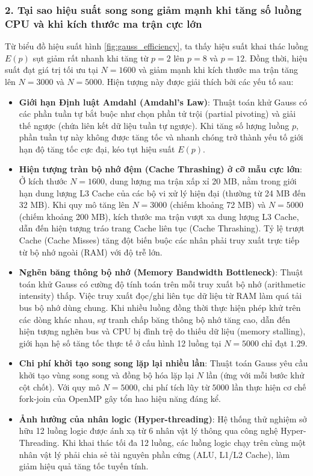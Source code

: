 \subsubsection{2. Tại sao hiệu suất song song giảm mạnh khi tăng số luồng CPU và khi kích thước ma trận cực lớn}
Từ biểu đồ hiệu suất hình \ref{fig:gauss_efficiency}, ta thấy hiệu suất khai thác luồng $E(p)$ sụt giảm rất nhanh khi tăng từ $p=2$ lên $p=8$ và $p=12$. Đồng thời, hiệu suất đạt giá trị tối ưu tại $N=1600$ và giảm mạnh khi kích thước ma trận tăng lên $N=3000$ và $N=5000$. Hiện tượng này được giải thích bởi các yếu tố sau:
\begin{itemize}
  \item \textbf{Giới hạn Định luật Amdahl (Amdahl's Law)}: Thuật toán khử Gauss có các phần tuần tự bắt buộc như chọn phần tử trội (partial pivoting) và giải thế ngược (chứa liên kết dữ liệu tuần tự ngược). Khi tăng số lượng luồng $p$, phần tuần tự này không được tăng tốc và nhanh chóng trở thành yếu tố giới hạn độ tăng tốc cực đại, kéo tụt hiệu suất $E(p)$.
  \item \textbf{Hiện tượng tràn bộ nhớ đệm (Cache Thrashing) ở cỡ mẫu cực lớn}: Ở kích thước $N=1600$, dung lượng ma trận xấp xỉ 20 MB, nằm trong giới hạn dung lượng L3 Cache của các bộ vi xử lý hiện đại (thường từ 24 MB đến 32 MB). Khi quy mô tăng lên $N=3000$ (chiếm khoảng 72 MB) và $N=5000$ (chiếm khoảng 200 MB), kích thước ma trận vượt xa dung lượng L3 Cache, dẫn đến hiện tượng tráo trang Cache liên tục (Cache Thrashing). Tỷ lệ trượt Cache (Cache Misses) tăng đột biến buộc các nhân phải truy xuất trực tiếp từ bộ nhớ ngoài (RAM) với độ trễ lớn.
  \item \textbf{Nghẽn băng thông bộ nhớ (Memory Bandwidth Bottleneck)}: Thuật toán khử Gauss có cường độ tính toán trên mỗi truy xuất bộ nhớ (arithmetic intensity) thấp. Việc truy xuất đọc/ghi liên tục dữ liệu từ RAM làm quá tải bus bộ nhớ dùng chung. Khi nhiều luồng đồng thời thực hiện phép khử trên các dòng khác nhau, sự tranh chấp băng thông bộ nhớ tăng cao, dẫn đến hiện tượng nghẽn bus và CPU bị đình trệ do thiếu dữ liệu (memory stalling), giới hạn hệ số tăng tốc thực tế ở cấu hình 12 luồng tại $N=5000$ chỉ đạt $1.29$.
  \item \textbf{Chi phí khởi tạo song song lặp lại nhiều lần}: Thuật toán Gauss yêu cầu khởi tạo vùng song song và đồng bộ hóa lặp lại $N$ lần (ứng với mỗi bước khử cột chốt). Với quy mô $N=5000$, chi phí tích lũy từ $5000$ lần thực hiện cơ chế fork-join của OpenMP gây tổn hao hiệu năng đáng kể.
  \item \textbf{Ảnh hưởng của nhân logic (Hyper-threading)}: Hệ thống thử nghiệm sở hữu 12 luồng logic được ánh xạ từ 6 nhân vật lý thông qua công nghệ Hyper-Threading. Khi khai thác tối đa 12 luồng, các luồng logic chạy trên cùng một nhân vật lý phải chia sẻ tài nguyên phần cứng (ALU, L1/L2 Cache), làm giảm hiệu quả tăng tốc tuyến tính.
\end{itemize}

